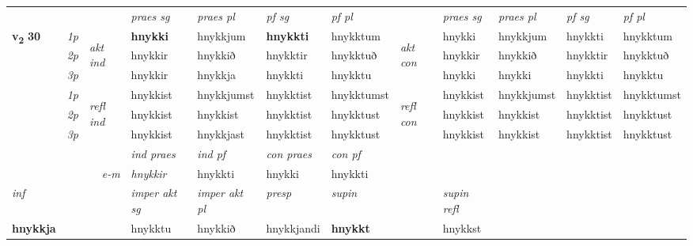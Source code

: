 \begin{longtable}[l]{X>{\footnotesize\itshape}llXXXXlXXXX}
 & &   & \textit{praes sg}  & \textit{praes pl}    & \textit{ pf sg} & \textit{pf pl} & & \textit{praes sg}  & \textit{praes pl}    & \textit{pf sg} & \textit{pf pl }  \\ \cmidrule{4-7} \cmidrule{9-12}
 \multirow{2}{*}{{{\textbf{v{\textsubscript{2}}} \Large{\textbf{30}}}}}  & 1p & \multirow{3}{*}{\begin{turn}{90}\textit{akt ind}\end{turn}} & \textbf{hnykki} & hnykkjum & \textbf{hnykkti} & hnykktum & \multirow{3}{*}{\begin{turn}{90}\textit{akt con}\end{turn}} &hnykki & hnykkjum & hnykkti & hnykktum\\*
 & 2p &  &  hnykkir  & hnykkið & hnykktir & hnykktuð & & hnykkir & hnykkið & hnykktir & hnykktuð \\*
 & 3p &  & hnykkir & hnykkja & hnykkti & hnykktu & & hnykki & hnykki& hnykkti & hnykktu \\*
\cmidrule{4-7} \cmidrule{9-12}
 & 1p & \multirow{3}{*}{\begin{turn}{90}\textit{refl ind}\end{turn}}  & hnykkist & hnykkjumst & hnykktist & hnykktumst & \multirow{3}{*}{\begin{turn}{90}\textit{refl con}\end{turn}}  &hnykkist & hnykkjumst & hnykktist & hnykktumst \\*
 & 2p &  & hnykkist & hnykkist & hnykktist & hnykktust & &hnykkist & hnykkist & hnykktist & hnykktust \\*
 & 3p  & & hnykkist & hnykkjast & hnykktist & hnykktust & & hnykkist & hnykkist& hnykktist & hnykktust \\*
\cmidrule{4-7} \cmidrule{9-12}

   && &  \textit{ind praes} & \textit{ind pf} & \textit{con praes} & \textit{con pf} \\*
\multicolumn{3}{r}{\textit{e-m}} & hnykkir & hnykkti & hnykki & hnykkti \\*

\cmidrule{4-7}
   {\textit{inf}} & &  & \textit{imper akt sg} & \textit{imper akt pl}   & \textit{presp} & \textit{supin} && \textit{supin refl}  \\*
  {\textbf{hnykkja}} & && hnykktu  & hnykkið   & hnykkjandi &  \textbf{hnykkt} && hnykkst  \\*

\midrule


\end{longtable}
